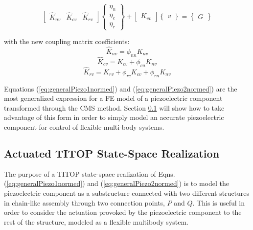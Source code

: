 \documentclass{ifacconf}
\begin{document}
\begin{equation}
\label{eq:generalPiezo2normed}
\begin{bmatrix} \hat{K}_{nv} &\hat{K}_{cv}  & \hat{K}_{rv}  \end{bmatrix} \begin{Bmatrix} \eta_n \\ \eta_c \\ \eta_r  \end{Bmatrix} + \begin{bmatrix} K_{vv} \end{bmatrix} \begin{Bmatrix} v \end{Bmatrix} = \begin{Bmatrix} G \end{Bmatrix}
\end{equation}
\normalsize

with the new coupling matrix coefficients:
\begin{equation}
\hat{K}_{nv} = \phi_{nn}K_{nv}
\end{equation}
\begin{equation}
\hat{K}_{cv} = K_{cv} + \phi_{cn}K_{nv} 
\end{equation}
\begin{equation}
\hat{K}_{rv} = K_{rv} + \phi_{rc}K_{cv} + \phi_{rn}K_{nv}
\end{equation}

Equations (\ref{eq:generalPiezo1normed}) and (\ref{eq:generalPiezo2normed}) are the most generalized expression for a FE model of a piezoelectric component transformed through the CMS method. Section \ref{subsec:SS} will show how to take advantage of this form in order to simply model an accurate piezoelectric component for control of flexible multi-body systems.

\subsection{Actuated TITOP State-Space Realization}
\label{subsec:SS}

The purpose of a TITOP state-space realization of Eqns. (\ref{eq:generalPiezo1normed}) and (\ref{eq:generalPiezo2normed}) is to model the piezoelectric component as a substructure connected with two different structures in chain-like assembly through two connection points, $P$ and $Q$. This is useful in order to consider the actuation provoked by the piezoelectric component to the rest of the structure, modeled as a flexible multibody system.
\end{document}
